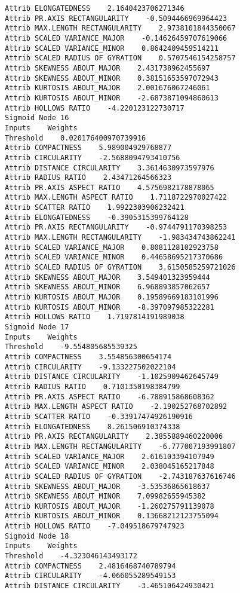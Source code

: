 \documentclass[
	article,			%
	11pt,				%
	oneside,			%
	a4paper,			%
	english,			%
	brazil,				%
	sumario=tradicional
	]{abntex2}
\begin{document}
\begin{lstlisting}
Attrib ELONGATEDNESS    2.1640423706271346
Attrib PR.AXIS RECTANGULARITY    -0.5094466969964423
Attrib MAX.LENGTH RECTANGULARITY    2.9738101844350067
Attrib SCALED VARIANCE_MAJOR    -0.14626459707619066
Attrib SCALED VARIANCE_MINOR    0.8642409459514211
Attrib SCALED RADIUS OF GYRATION    0.5707546154258757
Attrib SKEWNESS ABOUT_MAJOR    2.431738962455697
Attrib SKEWNESS ABOUT_MINOR    0.38151653597072943
Attrib KURTOSIS ABOUT_MAJOR    2.001676067246061
Attrib KURTOSIS ABOUT_MINOR    -2.6873871094860613
Attrib HOLLOWS RATIO    -4.220123122730717
Sigmoid Node 16
Inputs    Weights
Threshold    0.020176400970739916
Attrib COMPACTNESS    5.989004929768877
Attrib CIRCULARITY    -2.5688094793410756
Attrib DISTANCE CIRCULARITY    3.3614630973597976
Attrib RADIUS RATIO    2.43471264566323
Attrib PR.AXIS ASPECT RATIO    4.5756982178878065
Attrib MAX.LENGTH ASPECT RATIO    1.7118722970027422
Attrib SCATTER RATIO    1.9922303906232421
Attrib ELONGATEDNESS    -0.3905315399764128
Attrib PR.AXIS RECTANGULARITY    -0.9744791170398253
Attrib MAX.LENGTH RECTANGULARITY    -1.983434743862241
Attrib SCALED VARIANCE_MAJOR    0.8081128102923758
Attrib SCALED VARIANCE_MINOR    0.44658695217370686
Attrib SCALED RADIUS OF GYRATION    3.6150585259721026
Attrib SKEWNESS ABOUT_MAJOR    3.549401323959444
Attrib SKEWNESS ABOUT_MINOR    6.968893857062657
Attrib KURTOSIS ABOUT_MAJOR    0.19589669183101996
Attrib KURTOSIS ABOUT_MINOR    -8.397097985322281
Attrib HOLLOWS RATIO    1.7197814191989038
Sigmoid Node 17
Inputs    Weights
Threshold    -9.554805685539325
Attrib COMPACTNESS    3.554856300654174
Attrib CIRCULARITY    -9.133227502022104
Attrib DISTANCE CIRCULARITY    -1.1025909462645749
Attrib RADIUS RATIO    0.7101350198384799
Attrib PR.AXIS ASPECT RATIO    -6.788915868608362
Attrib MAX.LENGTH ASPECT RATIO    -2.190252768702892
Attrib SCATTER RATIO    -0.33917474926190916
Attrib ELONGATEDNESS    8.261506910374338
Attrib PR.AXIS RECTANGULARITY    2.3855889460220006
Attrib MAX.LENGTH RECTANGULARITY    -6.777007193991807
Attrib SCALED VARIANCE_MAJOR    2.616103394107949
Attrib SCALED VARIANCE_MINOR    2.038045165217848
Attrib SCALED RADIUS OF GYRATION    -2.743187637616746
Attrib SKEWNESS ABOUT_MAJOR    -3.53536865618637
Attrib SKEWNESS ABOUT_MINOR    7.09982655945382
Attrib KURTOSIS ABOUT_MAJOR    -1.260275791139078
Attrib KURTOSIS ABOUT_MINOR    0.13668212123755094
Attrib HOLLOWS RATIO    -7.049518679747923
Sigmoid Node 18
Inputs    Weights
Threshold    -4.323046143493172
Attrib COMPACTNESS    2.4816468740789794
Attrib CIRCULARITY    -4.066055289549153
Attrib DISTANCE CIRCULARITY    -3.465106424930421

\end{lstlisting}
\end{document}
